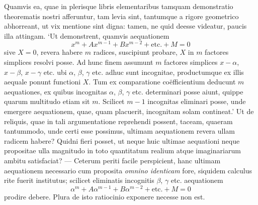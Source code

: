 \documentclass[twoside,12pt, showframe]{memoir}
\begin{document}
Quamvis ea, quae in plerisque libris elementaribus tamquam demonstratio theorematis nostri afferuntur, tam levia sint, tantumque a rigore geometrico abhorreant, ut vix mentione sint digna: tamen, ne quid deesse videatur, paucis illa attingam. `Ut demonstrent, quamvis aequationem \[x^m + Ax^{m-1} + Bx^{m-2} + \text{etc{.}} + M = 0\] sive \(X= 0\), revera habere \(m\) radices, suscipiunt probare, \(X\) in \(m\) factores simplices resolvi posse. Ad hunc finem assumunt \(m\) factores simplices \(x-\alpha\), \(x-\beta\), \(x-\gamma\) etc{.} ubi \(\alpha\), \(\beta\), \(\gamma\) etc{.} adhuc sunt incognitae, productumque ex illis aequale ponunt functioni \(X\). Tum ex comparatione co\"efficientium deducunt \(m\) aequationes, ex quibus incognitas \(\alpha\), \(\beta\), \(\gamma\) etc{.} determinari posse aiunt, quippe quarum multitudo etiam sit \(m\). Scilicet \(m-1\) incognitas eliminari posse, unde emergere aequationem, quae, quam placuerit, incognitam solam contineat.'  Ut de reliquis, quae in tali argumentatione reprehendi possent, taceam, quaeram tantummodo, unde certi esse possimus, ultimam aequationem revera ullam radicem habere? Quidni fieri posset, ut neque huic ultimae aequationi neque propositae ulla magnitudo in toto quantitatum realium atque imaginariarum ambitu satisfaciat? — Ceterum periti facile perspicient, hanc ultimam aequationem necessario cum proposita \textit{omnino identicam} fore, siquidem calculus rite fuerit institutus; scilicet eliminatis incognitis \(\beta\), \(\gamma\) etc{.} aequationem \[ \alpha^m + A\alpha^{m-1} + B\alpha^{m-2} + \text{etc{.}} + M = 0 \] prodire debere.  Plura de isto ratiocinio exponere necesse non est.
\end{document}
